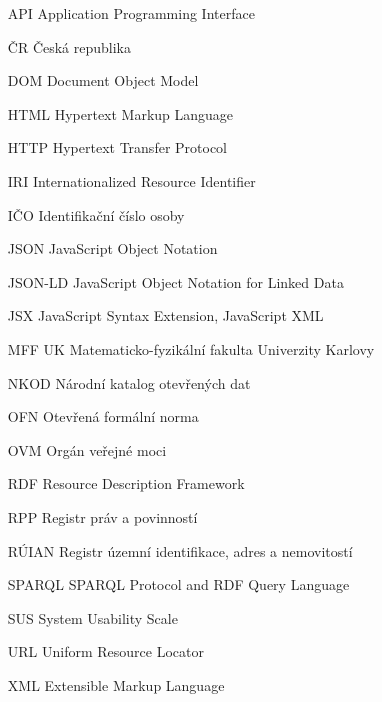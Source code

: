 \documentclass[12pt,a4paper]{report}
\begin{document}



\tableofcontents














\listoffigures



\begin{itemize}
    \item[API] Application Programming Interface
    \item[ČR] Česká republika
    \item[DOM] Document Object Model
    \item[HTML] Hypertext Markup Language
    \item[HTTP] Hypertext Transfer Protocol
    \item[IRI] Internationalized Resource Identifier
    \item[IČO] Identifikační číslo osoby
    \item[JSON] JavaScript Object Notation
    \item[JSON-LD] JavaScript Object Notation for Linked Data
    \item[JSX] JavaScript Syntax Extension, JavaScript XML
    \item[MFF UK] Matematicko-fyzikální fakulta Univerzity Karlovy
    \item[NKOD] Národní katalog otevřených dat
    \item[OFN] Otevřená formální norma
    \item[OVM] Orgán veřejné moci
    \item[RDF] Resource Description Framework
    \item[RPP] Registr práv a povinností
    \item[RÚIAN] Registr územní identifikace, adres a nemovitostí
    \item[SPARQL] SPARQL Protocol and RDF Query Language
    \item[SUS] System Usability Scale
    \item[URL] Uniform Resource Locator
    \item[XML] Extensible Markup Language
    
\end{itemize}
\end{document}
